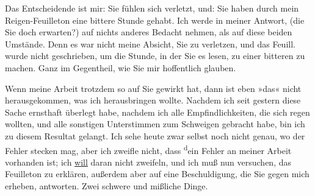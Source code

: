 \pstart
           Das Entscheidende ist mir: Sie fühlen sich verletzt, und: Sie haben durch mein Reigen-Feuilleton eine bittere
               Stunde gehabt. Ich werde in meiner Antwort, (die Sie doch erwarten?) auf nichts
               anderes Bedacht nehmen, als auf diese beiden Umstände. Denn es war nicht meine
               Absicht, Sie zu verletzen, und das Feuill. wurde nicht geschrieben, um die Stunde, in der Sie es lesen, zu
               einer bitteren zu machen. Ganz im Gegentheil, wie Sie mir hoffentlich glauben.\pend
           
\pstart
           Wenn meine Arbeit trotzdem so
               auf Sie gewirkt hat, dann ist eben »das« nicht herausgekommen, was ich herausbringen
               wollte. Nachdem ich seit gestern diese Sache ernsthaft
               überlegt habe, nachdem ich alle Empfindlichkeiten, die sich regen wollten, und alle
               sonstigen Unterstimmen zum Schweigen gebracht habe, bin ich zu diesem Resultat
               gelangt. Ich sehe heute zwar selbst noch nicht genau,
               wo der Fehler stecken mag, aber ich zweifle nicht, dass \substVorne{}\textsuperscript{d}\substDazwischen{}e\substHinten{}in Fehler an meiner Arbeit vorhanden ist; ich \uline{will} daran nicht
               zweifeln, und ich muß nun versuchen, das Feuilleton zu erklären, außerdem aber auf eine
               Beschuldigung, die Sie gegen mich erheben, antworten. Zwei schwere und  mißliche Dinge.\pend
           
